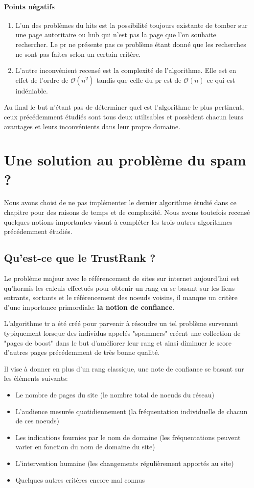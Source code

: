 \documentclass[12pt,twoside, openright]{memoir}
\begin{document}
	\paragraph*{Points négatifs}
	\begin{enumerate}
		\item L'un des problèmes du \gls{hits} est la possibilité toujours existante de tomber sur une page autoritaire ou hub qui n'est pas la page que l'on souhaite rechercher. Le \gls{pr} ne présente pas ce problème étant donné que les recherches ne sont pas faites selon un certain critère.
		\item L'autre inconvénient recensé est la complexité de l'algorithme. Elle est en effet de l'ordre de $\mathcal{O}(n^2)$ tandis que celle du \gls{pr} est de $\mathcal{O}(n)$ ce qui est indéniable.
	\end{enumerate}\par
	Au final le but n'étant pas de déterminer quel est l'algorithme le plus pertinent, ceux précédemment étudiés sont tous deux utilisables et possèdent chacun leurs avantages et leurs inconvénients dans leur propre domaine.
	\section{Une solution au problème du spam ?}
	Nous avons choisi de ne pas implémenter le dernier algorithme étudié dans ce chapitre pour des raisons de temps et de complexité. Nous avons toutefois recensé quelques notions importantes visant à compléter les trois autres algorithmes précédemment étudiés.
	\subsection{Qu'est-ce que le TrustRank ?}
	Le problème majeur avec le référencement de sites sur internet aujourd'hui est qu'hormis les calculs effectués pour obtenir un rang en se basant sur les liens entrants, sortants et le référencement des noeuds voisins, il manque un critère d'une importance primordiale: 
	\textbf{la notion de confiance}.\par
	L'algorithme \gls{tr} a été créé pour parvenir à résoudre un tel problème survenant typiquement lorsque des individus appelés "spammers" créent une collection de "pages de boost" dans le but d'améliorer leur rang et ainsi diminuer le score d'autres pages précédemment de très bonne qualité. \cite{ref_spamtr}\par
	Il vise à donner en plus d'un rang classique, une note de confiance se basant sur les éléments suivants:
	\begin{itemize}
		\item Le nombre de pages du site (le nombre total de noeuds du réseau)
		\item L'audience mesurée quotidiennement (la fréquentation individuelle de chacun de ces noeuds)
		\item Les indications fournies par le nom de domaine (les fréquentations peuvent varier en fonction du nom de domaine du site)
		\item L'intervention humaine (les changements régulièrement apportés au site)
		\item Quelques autres critères encore mal connus
	\end{itemize}
\end{document}
